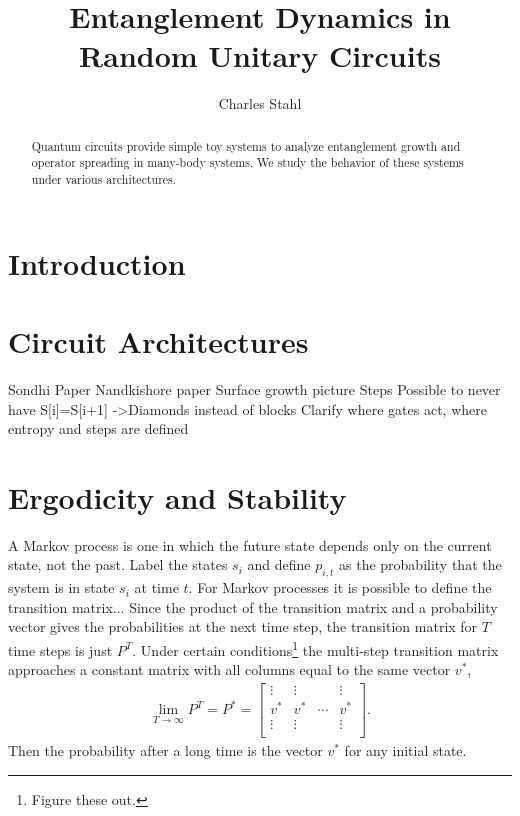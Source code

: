 \documentclass[11pt]{article}
\begin{document}
\title{Entanglement Dynamics in Random Unitary Circuits}
\author{Charles Stahl}

\maketitle

\begin{abstract}
	Quantum circuits provide simple toy systems to analyze entanglement growth and operator spreading in many-body systems. We study the behavior of these systems under various architectures.
\end{abstract}

\tableofcontents

\newpage

\section{Introduction} \label{sec:intro}

\section{Circuit Architectures} \label{sec:arch}

Sondhi Paper
Nandkishore paper
Surface growth picture
Steps
Possible to never have S[i]=S[i+1]
->Diamonds instead of blocks
Clarify where gates act, where entropy and steps are defined

\section{Ergodicity and Stability} \label{sec:erg}

A Markov process is one in which the future state depends only on the current state, not the past. Label the states $s_i$ and define $p_{i,t}$ as the probability that the system is in state $s_i$ at time $t$. For Markov processes it is possible to define the transition matrix... Since the product of the transition matrix and a probability vector gives the probabilities at the next time step, the transition matrix for $T$ time steps is just $P^T$. Under certain conditions\footnote{Figure these out.} the multi-step transition matrix approaches a constant matrix with all columns equal to the same vector $v^*$,
\begin{align}
\lim\limits_{T\to \infty}P^T = P^* = \begin{bmatrix}
\vdots & \vdots &  & \vdots\\
v^* & v^* & \cdots & v^*\\
\vdots & \vdots &  & \vdots\\
\end{bmatrix}.
\end{align}
Then the probability after a long time is the vector $v^*$ for any initial state.
\end{document}
